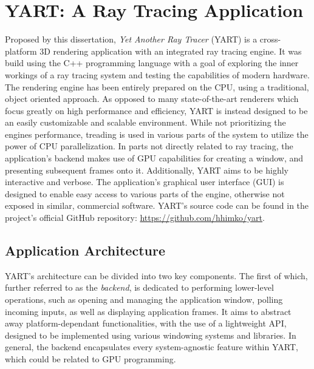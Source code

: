 
\chapter{YART: A Ray Tracing Application} \label{ch:Application}
\vspace*{-2pt}

Proposed by this dissertation, \textit{Yet Another Ray Tracer} (YART) is a cross-platform 3D rendering application with an integrated ray tracing engine. 
It was build using the C++ programming language with a goal of exploring the inner workings of a ray tracing system and testing the capabilities of modern hardware.
The rendering engine has been entirely prepared on the CPU, using a traditional, object oriented approach.
As opposed to many state-of-the-art renderers which focus greatly on high performance and efficiency, YART is instead designed to be an easily customizable and scalable environment. 
While not prioritizing the engines performance, treading is used in various parts of the system to utilize the power of CPU parallelization.
In parts not directly related to ray tracing, the application's backend makes use of GPU capabilities for creating a window, and presenting subsequent frames onto it.
Additionally, YART aims to be highly interactive and verbose.
The application's graphical user interface (GUI) is designed to enable easy access to various parts of the engine, otherwise not exposed in similar, commercial software. 
YART's source code can be found in the project's official GitHub repository: \url{https://github.com/hhimko/yart}. 

\section{Application Architecture}

YART's architecture can be divided into two key components.
The first of which, further referred to as the \textit{backend}, is dedicated to performing lower-level operations, such as opening and managing the application window, polling incoming inputs, as well as displaying application frames. 
It aims to abstract away platform-dependant functionalities, with the use of a lightweight API, designed to be implemented using various windowing systems and libraries. 
In general, the backend encapsulates every system-agnostic feature within YART, which could be related to GPU programming.

